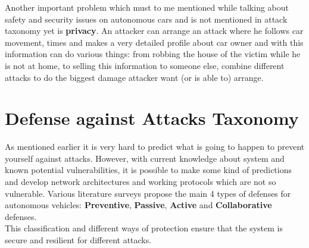 Another important problem which must to me mentioned while talking about safety and security issues on autonomous cars and is not mentioned in attack taxonomy yet is \textbf{privacy}. An attacker can arrange an attack where he follows car movement, times and makes a very detailed profile about car owner and with this information can do various things: from robbing the house of the victim while he is not at home, to selling this information to someone else, combine different attacks to do the biggest damage attacker want (or is able to) arrange.

\section{Defense against Attacks Taxonomy}

As mentioned earlier it is very hard to predict what is going to happen to prevent yourself against attacks. However, with current knowledge about system and known potential vulnerabilities, it is possible to make some kind of predictions and develop network architectures and working protocols which are not so vulnerable. Various literature surveys propose the main 4 types of defenses for autonomous vehicles: \textbf{Preventive}, \textbf{Passive}, \textbf{Active} and \textbf{Collaborative} defenses. \\

This classification and different ways of protection ensure that the system is secure and resilient for different attacks.

